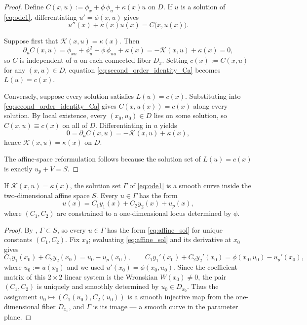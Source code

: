 \documentclass[preprint,a4paper]{elsarticle}
\begin{document}
\begin{proof}
Define $C(x,u):=\phi_x+\phi\,\phi_u+\kappa(x)u$ on $D$. If $u$ is a solution of \eqref{eq:ode1}, differentiating $u'=\phi(x,u)$ gives
\begin{equation}\label{eq:second_order_identity_Ca}
u''(x)+\kappa(x)u(x)=C\bigl(x,u(x)\bigr).
\end{equation}

Suppose first that $\mathcal{K}(x,u)=\kappa(x)$. Then
\[
\partial_u C(x,u)=\phi_{xu}+\phi_u^2+\phi\,\phi_{uu}+\kappa(x)=-\mathcal{K}(x,u)+\kappa(x)=0,
\]
so $C$ is independent of $u$ on each connected fiber $D_x$. Setting $c(x):=C(x,u)$ for any $(x,u)\in D$, equation \eqref{eq:second_order_identity_Ca} becomes $L(u)=c(x)$.

Conversely, suppose every solution satisfies $L(u)=c(x)$. Substituting into \eqref{eq:second_order_identity_Ca} gives $C(x,u(x))=c(x)$ along every solution. By local existence, every $(x_0,u_0)\in D$ lies on some solution, so $C(x,u)\equiv c(x)$ on all of $D$. Differentiating in $u$ yields
\[
0=\partial_u C(x,u)=-\mathcal{K}(x,u)+\kappa(x),
\]
hence $\mathcal{K}(x,u)=\kappa(x)$ on $D$.

The affine-space reformulation follows because the solution set of $L(u)=c(x)$ is exactly $u_p+V=S$.
\end{proof}



\begin{corollary}\label{cor:one_dim_locus}
If $\mathcal{K}(x,u)=\kappa(x)$, the solution set $\Gamma$ of \eqref{eq:ode1} is a smooth curve inside the two-dimensional affine space $S$. Every $u\in\Gamma$ has the form
\begin{equation}\label{eq:affine_sol}
  u(x)=C_1 y_1(x)+C_2 y_2(x)+u_p(x),
\end{equation}
where $(C_1,C_2)$ are constrained to a one-dimensional locus determined by $\phi$.
\end{corollary}
\begin{proof}
By , $\Gamma\subset S$, so every $u\in\Gamma$ has the form \eqref{eq:affine_sol} for unique constants $(C_1,C_2)$. Fix $x_0$; evaluating \eqref{eq:affine_sol} and its derivative at $x_0$ gives
\[
  C_1 y_1(x_0)+C_2 y_2(x_0) = u_0 - u_p(x_0), \qquad
  C_1 y_1'(x_0)+C_2 y_2'(x_0) = \phi(x_0,u_0) - u_p'(x_0),
\]
where $u_0 := u(x_0)$ and we used $u'(x_0)=\phi(x_0,u_0)$. Since the coefficient matrix of this $2\times 2$ linear system is the Wronskian $W(x_0)\neq 0$, the pair $(C_1,C_2)$ is uniquely and smoothly determined by $u_0\in D_{x_0}$. Thus the assignment $u_0\mapsto(C_1(u_0),C_2(u_0))$ is a smooth injective map from the one-dimensional fiber $D_{x_0}$, and $\Gamma$ is its image — a smooth curve in the parameter plane.
\end{proof}
\end{document}

